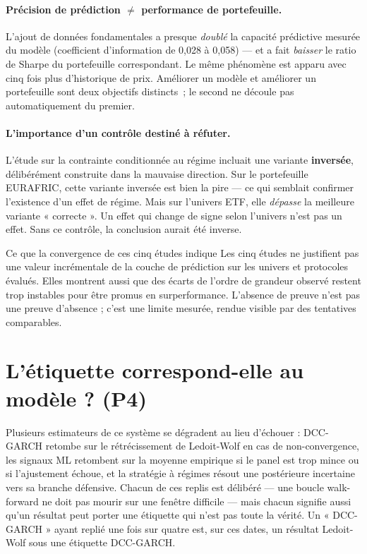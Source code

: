 \paragraph{Précision de prédiction $\neq$ performance de portefeuille.} L'ajout
de données fondamentales a presque \emph{doublé} la capacité prédictive mesurée
du modèle (coefficient d'information de 0,028 à 0,058) — et a fait \emph{baisser}
le ratio de Sharpe du portefeuille correspondant. Le même phénomène est apparu
avec cinq fois plus d'historique de prix. Améliorer un modèle et améliorer un
portefeuille sont deux objectifs distincts~; le second ne découle pas
automatiquement du premier.

\paragraph{L'importance d'un contrôle destiné à réfuter.} L'étude sur la
contrainte conditionnée au régime incluait une variante \textbf{inversée},
délibérément construite dans la mauvaise direction. Sur le portefeuille EURAFRIC,
cette variante inversée est bien la pire — ce qui semblait confirmer l'existence
d'un effet de régime. Mais sur l'univers ETF, elle \emph{dépasse} la meilleure
variante « correcte ». Un effet qui change de signe selon l'univers n'est pas un
effet. Sans ce contrôle, la conclusion aurait été inverse.

\begin{resultatbox}{Ce que la convergence de ces cinq études indique}
Les cinq études ne justifient pas une valeur incrémentale de la couche de
prédiction sur les univers et protocoles évalués. Elles montrent aussi que des
écarts de l'ordre de grandeur observé restent trop instables pour être promus en
surperformance. L'absence de preuve n'est pas une preuve d'absence ; c'est une
limite mesurée, rendue visible par des tentatives comparables.
\end{resultatbox}

\section{L'étiquette correspond-elle au modèle ? (P4)}

Plusieurs estimateurs de ce système se dégradent au lieu d'échouer : DCC-GARCH
retombe sur le rétrécissement de Ledoit-Wolf en cas de non-convergence, les
signaux ML retombent sur la moyenne empirique si le panel est trop mince ou si
l'ajustement échoue, et la stratégie à régimes résout une postérieure incertaine
vers sa branche défensive. Chacun de ces replis est délibéré — une boucle
walk-forward ne doit pas mourir sur une fenêtre difficile — mais chacun signifie
aussi qu'un résultat peut porter une étiquette qui n'est pas toute la vérité. Un
« DCC-GARCH » ayant replié une fois sur quatre est, sur ces dates, un résultat
Ledoit-Wolf sous une étiquette DCC-GARCH.

